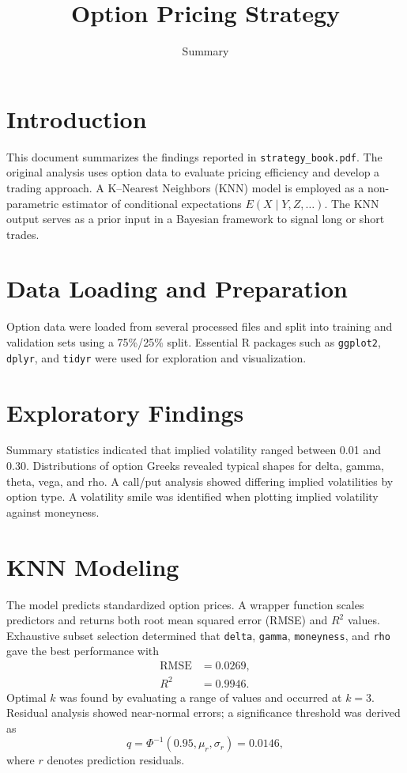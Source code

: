 \documentclass{article}
\title{Option Pricing Strategy}
\author{Summary}
\date{}
\begin{document}
\maketitle
\section{Introduction}
This document summarizes the findings reported in \texttt{strategy\_book.pdf}. The original analysis uses option data to evaluate pricing efficiency and develop a trading approach. A K--Nearest Neighbors (KNN) model is employed as a non-parametric estimator of conditional expectations $E(X\mid Y,Z,\ldots)$. The KNN output serves as a prior input in a Bayesian framework to signal long or short trades.
\section{Data Loading and Preparation}
Option data were loaded from several processed files and split into training and validation sets using a 75\%/25\% split. Essential R packages such as \texttt{ggplot2}, \texttt{dplyr}, and \texttt{tidyr} were used for exploration and visualization.
\section{Exploratory Findings}
Summary statistics indicated that implied volatility ranged between 0.01 and 0.30. Distributions of option Greeks revealed typical shapes for delta, gamma, theta, vega, and rho. A call/put analysis showed differing implied volatilities by option type. A volatility smile was identified when plotting implied volatility against moneyness.
\section{KNN Modeling}
The model predicts standardized option prices. A wrapper function scales predictors and returns both root mean squared error (RMSE) and $R^2$ values. Exhaustive subset selection determined that \verb|delta|, \verb|gamma|, \verb|moneyness|, and \verb|rho| gave the best performance with
\begin{align*}
\text{RMSE} &= 0.0269,\\
R^2 &= 0.9946.
\end{align*}
Optimal $k$ was found by evaluating a range of values and occurred at $k=3$. Residual analysis showed near-normal errors; a significance threshold was derived as
\begin{equation*}
q = \Phi^{-1}(0.95,\mu_{r},\sigma_{r}) = 0.0146,
\end{equation*}
where $r$ denotes prediction residuals.
\end{document}
